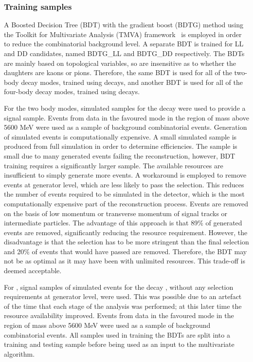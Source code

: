 \subsubsection{Training samples}

A Boosted Decision Tree (BDT) with the gradient boost (BDTG) method using the Toolkit for Multivariate Analysis (TMVA) framework~\cite{TMVA} is employed in order to reduce the combinatorial background level. A separate BDT is trained for LL and DD candidates, named BDTG\_LL and BDTG\_DD respectively. The BDTs are mainly based on topological variables, so are insensitive as to whether the \Dz daughters are kaons or pions. Therefore, the same BDT is used for all of the two-body \Dz decay modes, trained using \kpi decays, and another BDT is used for all of the four-body \Dz decay modes, trained using \kpipipi decays. 

For the two body modes, simulated samples for the decay \kpi were used to provide a signal sample. Events from data in the favoured \kpi mode in the region of \Bm mass above 5600 MeV were used as a sample of background combinatorial events. Generation of simulated events is computationally expensive. A small simulated sample is produced from full \lhcb simulation in order to determine efficiencies. The sample is small due to many generated events failing the reconstruction, however, BDT training requires a significantly larger sample. The available resources are insufficient to simply generate more events. A workaround is employed to remove events at generator level, which are less likely to pass the selection. This reduces the number of events required to be simulated in the \lhcb detector, which is the most computationally expensive part of the reconstruction process. Events are removed on the basis of low momentum or transverse momentum of signal tracks or intermediate particles. The advantage of this approach is that 89\% of generated events are removed, significantly reducing the resource requirement. However, the disadvantage is that the selection has to be more stringent than the final selection and 20\% of events that would have passed are removed. Therefore, the BDT may not be as optimal as it may have been with unlimited resources. This trade-off is deemed acceptable.

For \kpipipi, signal samples of simulated events for the decay \kpipipi, without any selection requirements at generator level, were used. This was possible due to an artefact of the time that each stage of the analysis was performed; at this later time the resource availability improved. Events from data in the favoured \kpipipi mode in the region of \Bm mass above 5600 MeV were used as a sample of background combinatorial events. All samples used in training the BDTs are split into a training and testing sample before being used as an input to the multivariate algorithm.

